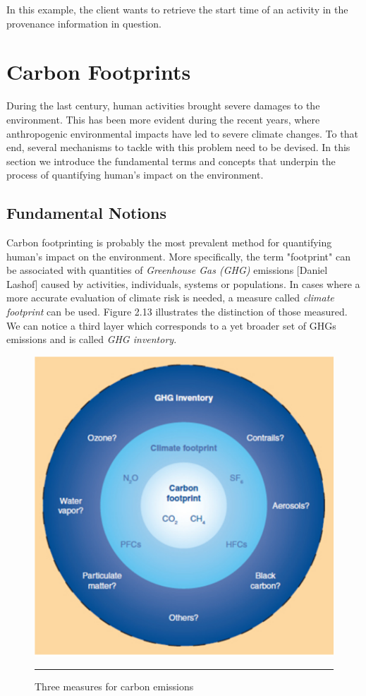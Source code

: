 In this example, the client wants to retrieve the start time of an activity in the provenance information in question.

\section{Carbon Footprints}

During the last century, human activities brought severe damages to the environment. This has been more evident during the recent years, where anthropogenic environmental impacts have led to severe climate changes\cite{reference23:1}. To that end, several mechanisms to tackle with this problem need to be devised. In this section we introduce the fundamental terms and concepts that underpin the process of quantifying human's impact on the environment.

\subsection{Fundamental Notions}

Carbon footprinting is probably the most prevalent method for quantifying human's impact on the environment. More specifically, the term "footprint" can be associated with quantities of \emph{Greenhouse Gas (GHG)} emissions [Daniel Lashof] caused by activities, individuals, systems or populations. In cases where a more accurate evaluation of climate risk is needed, a measure called \emph{climate footprint}\cite{reference23:3} can be used. Figure 2.13 illustrates the distinction of those measured. We can notice a third layer which corresponds to a yet broader set of GHGs emissions and is called \emph{GHG inventory}.

\begin{figure}[htbp]
	\centering
		\includegraphics{./Figures/figure16.pdf}
		\rule{35em}{0.5pt}
	\caption[Carbon Emissions Measures]{Three measures for carbon emissions\cite{reference23}}
	\label{fig:ghgEmissionMeasures}
\end{figure}


